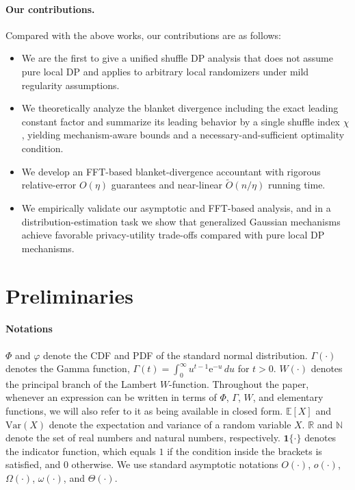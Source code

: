 \documentclass{article}
\theoremstyle{plain}
\theoremstyle{definition}
\begin{document}
\paragraph{Our contributions.}
Compared with the above works, our contributions are as follows:
\begin{itemize}
  \item We are the first to give a unified shuffle DP analysis that does not assume pure local DP and applies to arbitrary local randomizers under mild regularity assumptions.

  \item We theoretically analyze the blanket divergence including the exact leading constant factor and summarize its leading behavior by a single shuffle index $\chi$, yielding mechanism-aware bounds and a necessary-and-sufficient optimality condition.

  \item We develop an FFT-based blanket-divergence accountant with rigorous relative-error $O(\eta)$ guarantees and near-linear $\widetilde O(n/\eta)$ running time.

  \item We empirically validate our asymptotic and FFT-based analysis, and in a distribution-estimation task we show that generalized Gaussian mechanisms achieve favorable privacy-utility trade-offs compared with pure local DP mechanisms.
\end{itemize}



\section{Preliminaries}




\paragraph{Notations}
$\Phi$ and $\varphi$ denote the CDF and PDF of the standard normal distribution.
$\Gamma(\cdot)$ denotes the Gamma function,
$\Gamma(t) = \int_0^\infty u^{t-1}\mathrm{e}^{-u}\,du$ for $t>0$.
$W(\cdot)$ denotes the principal branch of the Lambert
$W$-function.
Throughout the paper, whenever an expression can be written in terms of $\Phi$, $\Gamma$, $W$, and elementary functions, we will also refer to it as being available in closed form.
$\mathbb{E}[X]$ and $\mathrm{Var}(X)$ denote the expectation and variance of a random variable $X$.
$\mathbb{R}$ and $\mathbb{N}$ denote the set of real numbers and natural numbers, respectively.
$\mathbf{1}\{\cdot\}$ denotes the indicator function, which equals $1$ if the condition inside the brackets is satisfied, and $0$ otherwise. We use standard asymptotic notations $O(\cdot)$, $o(\cdot)$, $\Omega(\cdot)$, $\omega(\cdot)$, and $\Theta(\cdot)$.
\end{document}
